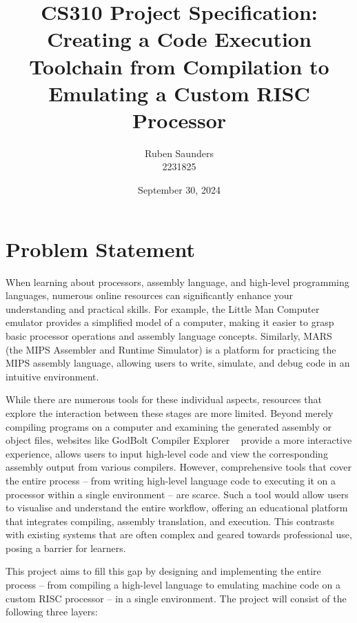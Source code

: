 \documentclass{article}
\begin{document}
    \title{CS310 Project Specification:\\Creating a Code Execution Toolchain from Compilation to Emulating a Custom RISC Processor}
    \author{Ruben Saunders\\2231825}
    \date{September 30, 2024}

    \maketitle

    \section{Problem Statement}\label{sec:problem-statement}

    When learning about processors, assembly language, and high-level programming languages, numerous online resources can significantly enhance your understanding and practical skills.
    For example, the Little Man Computer ~\cite{lmc} emulator provides a simplified model of a computer, making it easier to grasp basic processor operations and assembly language concepts.
    Similarly, MARS ~\cite{mars-simulator} (the MIPS Assembler and Runtime Simulator) is a platform for practicing the MIPS assembly language, allowing users to write, simulate, and debug code in an intuitive environment.

    While there are numerous tools for these individual aspects, resources that explore the interaction between these stages are more limited.
    Beyond merely compiling programs on a computer and examining the generated assembly or object files, websites like GodBolt Compiler Explorer ~\cite{godbolt} provide a more interactive experience, allows users to input high-level code and view the corresponding assembly output from various compilers.
    However, comprehensive tools that cover the entire process -- from writing high-level language code to executing it on a processor within a single environment -- are scarce.
    Such a tool would allow users to visualise and understand the entire workflow, offering an educational platform that integrates compiling, assembly translation, and execution.
    This contrasts with existing systems that are often complex and geared towards professional use, posing a barrier for learners.

    \medskip
    This project aims to fill this gap by designing and implementing the entire process -- from compiling a high-level language to emulating machine code on a custom RISC processor -- in a single environment.
    The project will consist of the following three layers:
\end{document}
